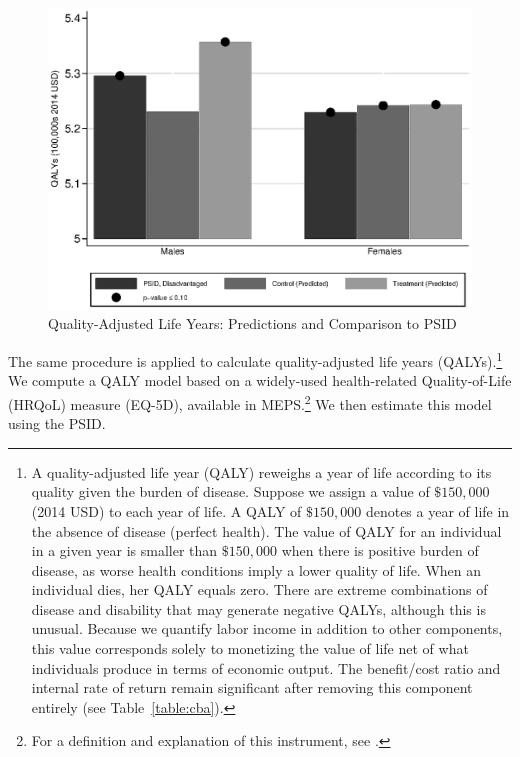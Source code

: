 \begin{figure}[!htbp]
\caption{Quality-Adjusted Life Years: Predictions and Comparison to PSID}\label{fig:qalys}
\centering
\includegraphics[width=.7\columnwidth]{output/qalyexppsid.eps}
\end{figure}

The same procedure is applied to calculate quality-adjusted life years (QALYs).\footnote{A quality-adjusted life year (QALY) reweighs a year of life according to its quality given the burden of disease. Suppose we assign a value of $\$150,000$ (2014 USD) to each year of life. A QALY of $\$150,000$ denotes a year of life in the absence of disease (perfect health). The value of QALY for an individual in a given year is smaller than $\$150,000$ when there is positive burden of disease, as worse health conditions imply a lower quality of life. When an individual dies, her QALY equals zero. There are extreme combinations of disease and disability that may generate negative QALYs, although this is unusual. Because we quantify labor income in addition to other components, this value corresponds solely to monetizing the value of life net of what individuals produce in terms of economic output. The benefit/cost ratio and internal rate of return remain significant after removing this component entirely (see Table~\ref{table:cba}).} We compute a QALY model based on a widely-used health-related Quality-of-Life (HRQoL) measure (EQ-5D), available in MEPS.\footnote{For a definition and explanation of this instrument, see \citet{Dolan_1997_Modeling_MC,Shaw_etal_2005_EQ5D_MC}.} We then estimate this model using the PSID.

